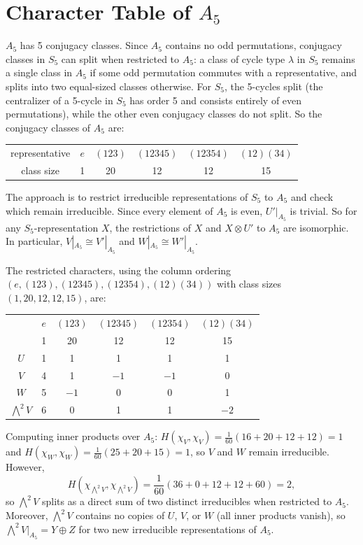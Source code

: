 \documentclass{report}
\begin{document}
\section{Character Table of \(A_5\)}

\(A_5\) has 5 conjugacy classes. Since \(A_5\) contains no odd permutations, conjugacy classes in \(S_5\) can split when restricted to \(A_5\): a class of cycle type \(\lambda\) in \(S_5\) remains a single class in \(A_5\) if some odd permutation commutes with a representative, and splits into two equal-sized classes otherwise. For \(S_5\), the 5-cycles split (the centralizer of a 5-cycle in \(S_5\) has order 5 and consists entirely of even permutations), while the other even conjugacy classes do not split. So the conjugacy classes of \(A_5\) are:

\begin{center}
\begin{tabular}{c|ccccc}
representative & \(e\) & \((123)\) & \((12345)\) & \((12354)\) & \((12)(34)\) \\
class size & 1 & 20 & 12 & 12 & 15
\end{tabular}
\end{center}

The approach is to restrict irreducible representations of \(S_5\) to \(A_5\) and check which remain irreducible. Since every element of \(A_5\) is even, \(U'|_{A_5}\) is trivial. So for any \(S_5\)-representation \(X\), the restrictions of \(X\) and \(X \otimes U'\) to \(A_5\) are isomorphic. In particular, \(V|_{A_5} \cong V'|_{A_5}\) and \(W|_{A_5} \cong W'|_{A_5}\).

The restricted characters, using the column ordering \((e, (123), (12345), (12354), (12)(34))\) with class sizes \((1, 20, 12, 12, 15)\), are:

\begin{center}
\begin{tabular}{c|ccccc}
& \(e\) & \((123)\) & \((12345)\) & \((12354)\) & \((12)(34)\) \\
& 1 & 20 & 12 & 12 & 15 \\ \hline
\(U\) & 1 & 1 & 1 & 1 & 1 \\
\(V\) & 4 & 1 & \(-1\) & \(-1\) & 0 \\
\(W\) & 5 & \(-1\) & 0 & 0 & 1 \\
\(\bigwedge^2 V\) & 6 & 0 & 1 & 1 & \(-2\)
\end{tabular}
\end{center}

Computing inner products over \(A_5\): \(H(\chi_V, \chi_V) = \frac{1}{60}(16 + 20 + 12 + 12) = 1\) and \(H(\chi_W, \chi_W) = \frac{1}{60}(25 + 20 + 15) = 1\), so \(V\) and \(W\) remain irreducible. However,
\[H(\chi_{\bigwedge^2 V}, \chi_{\bigwedge^2 V}) = \frac{1}{60}(36 + 0 + 12 + 12 + 60) = 2,\]
so \(\bigwedge^2 V\) splits as a direct sum of two distinct irreducibles when restricted to \(A_5\). Moreover, \(\bigwedge^2 V\) contains no copies of \(U\), \(V\), or \(W\) (all inner products vanish), so \(\bigwedge^2 V|_{A_5} = Y \oplus Z\) for two new irreducible representations of \(A_5\).
\end{document}
